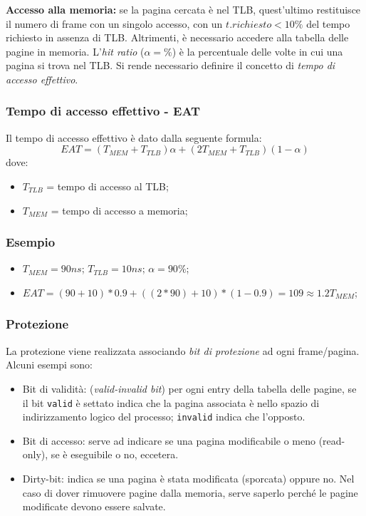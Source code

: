 \documentclass[a4paper,12pt, twoside]{report}
\begin{document}
\textbf{Accesso alla memoria:} se la pagina cercata \`e nel TLB, quest'ultimo restituisce il numero di frame con un
singolo accesso, con un $t. richiesto < 10\%$ del tempo richiesto in assenza di TLB. Altrimenti, \`e necessario accedere
alla tabella delle pagine in memoria. L'\emph{hit ratio} ($\alpha = \%$) \`e la percentuale delle volte in cui una pagina
si trova nel TLB. Si rende necessario definire il concetto di \emph{tempo di accesso effettivo}.

\subsubsection{Tempo di accesso effettivo - EAT}
Il tempo di accesso effettivo \`e dato dalla seguente formula:
\[ EAT = (T_{MEM} + T_{TLB}) \alpha + (2 T_{MEM} + T_{TLB})(1-\alpha) \]
dove:
\begin{itemize}
\item $T_{TLB}$ = tempo di accesso al TLB;
\item $T_{MEM}$ = tempo di accesso a memoria;
\end{itemize}

\subsubsection{Esempio}
\begin{itemize}
\item $T_{MEM} = 90 ns$; $T_{TLB} = 10 ns$; $\alpha = 90\%$;
\item $EAT = (90 + 10) * 0.9 + ((2 * 90) + 10) * (1 - 0.9) = 109 \approx 1.2 T_{MEM}$;
\end{itemize}

\subsubsection{Protezione}
La protezione viene realizzata associando \emph{bit di protezione} ad ogni frame/pagina. Alcuni esempi sono:
\begin{itemize}
    \item Bit di validit\`a: (\emph{valid-invalid bit}) per ogni entry della tabella delle pagine, se il bit \texttt{valid} \`e settato indica che la pagina associata \`e nello spazio di indirizzamento logico del processo; \texttt{invalid} indica che l'opposto.
\item Bit di accesso: serve ad indicare se una pagina modificabile o meno (read-only), se \`e eseguibile o no, eccetera.
\item Dirty-bit: indica se una pagina \`e stata modificata (sporcata) oppure no. Nel caso di dover rimuovere pagine dalla memoria, serve saperlo perch\'e le pagine modificate devono essere salvate.
\end{itemize}
\end{document}
